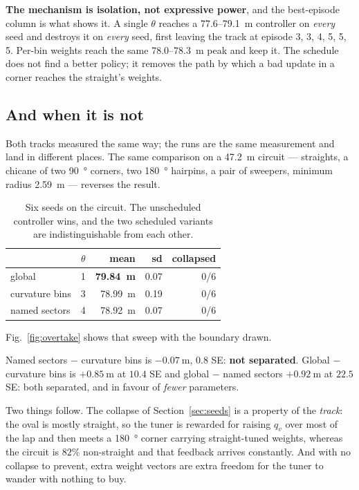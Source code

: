 \documentclass[letterpaper, 10 pt, conference]{ieeeconf}
\begin{document}
\textbf{The mechanism is isolation, not expressive power}, and the best-episode
column is what shows it. A single $\theta$ reaches a \SI{77.6}{}--\SI{79.1}{\meter}
controller on \emph{every} seed and destroys it on \emph{every} seed, first
leaving the track at episode 3, 3, 4, 5, 5, 5. Per-bin weights reach the same
\SI{78.0}{}--\SI{78.3}{\meter} peak and keep it. The schedule does not find a
better policy; it removes the path by which a bad update in a corner reaches
the straight's weights.

\subsection{And when it is not}\label{sec:circuit}
Both tracks measured the same way; the runs are the same
measurement and land in different places. The same comparison on a
\SI{47.2}{\meter} circuit --- straights, a chicane of
two \SI{90}{\degree} corners, two \SI{180}{\degree} hairpins, a pair of
sweepers, minimum radius \SI{2.59}{\meter} --- reverses the result.

\begin{table}[t]
  \centering
  \caption{Six seeds on the circuit. The unscheduled controller wins, and the
  two scheduled variants are indistinguishable from each other.}
  \label{tab:circuit}
  \begin{tabular}{lrrrr}
    \toprule
    & $\theta$ & mean & sd & collapsed \\
    \midrule
    global          & 1 & \textbf{\SI{79.84}{\meter}} & 0.07 & 0/6 \\
    curvature bins  & 3 & \SI{78.99}{\meter}          & 0.19 & 0/6 \\
    named sectors   & 4 & \SI{78.92}{\meter}          & 0.07 & 0/6 \\
    \bottomrule
  \end{tabular}
\end{table}

Fig.~\ref{fig:overtake} shows that sweep with the boundary drawn.

Named sectors $-$ curvature bins is $\SI{-0.07}{\meter}$, $0.8$ SE: \textbf{not
separated}. Global $-$ curvature bins is $+\SI{0.85}{\meter}$ at $10.4$ SE and
global $-$ named sectors $+\SI{0.92}{\meter}$ at $22.5$ SE: both separated, and
in favour of \emph{fewer} parameters.

Two things follow. The collapse of Section~\ref{sec:seeds} is a property of the
\emph{track}: the oval is mostly straight, so the tuner is rewarded for raising
$q_v$ over most of the lap and then meets a \SI{180}{\degree} corner carrying
straight-tuned weights, whereas the circuit is $82\%$ non-straight and that
feedback arrives constantly. And with no collapse to prevent, extra weight
vectors are extra freedom for the tuner to wander with nothing to buy.
\end{document}
